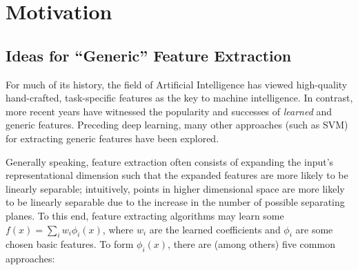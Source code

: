 \chapter{Motivation}\label{chp:motivation}

\section{Ideas for “Generic” Feature Extraction}\label{ssec:generic-feature-extraction}

For much of its history, the field of Artificial Intelligence has viewed high-quality hand-crafted, task-specific features as the key to machine intelligence.
In contrast, more recent years have witnessed the popularity and successes of \textit{learned} and generic features.
Preceding deep learning, many other approaches (such as SVM) for extracting generic features have been explored.

Generally speaking, feature extraction often consists of expanding the input's representational dimension such that the expanded features are more likely to be linearly separable; intuitively, points in higher dimensional space are more likely to be linearly separable due to the increase in the number of possible separating planes.
To this end, feature extracting algorithms may learn some $f(x)=\sum_i w_i \phi_i (x)$, where $w_i$ are the learned coefficients and $\phi_i$ are some chosen basic features.
To form $\phi_i (x)$, there are (among others) five common approaches:

